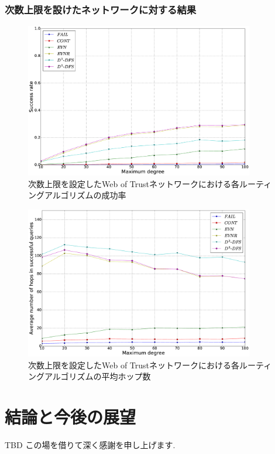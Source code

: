 \documentclass[dvipdfmx]{ampbt}
\begin{document}
   \subsubsection{次数上限を設けたネットワークに対する結果}
   \begin{figure}[!h]
    \centerline{\includegraphics[width=100mm]{../fig/clip_succ.eps}}
    \caption{次数上限を設定したWeb of Trustネットワークにおける各ルーティングアルゴリズムの成功率}
    \label{fig:clip_succ}
   \end{figure}
   \begin{figure}[!h]
    \centerline{\includegraphics[width=100mm]{../fig/clip_hops.eps}}
    \caption{次数上限を設定したWeb of Trustネットワークにおける各ルーティングアルゴリズムの平均ホップ数}
    \label{fig:clip_hops}
   \end{figure}

\section{結論と今後の展望}
TBD
\acknowledgment
この場を借りて深く感謝を申し上げます.
\end{document}
